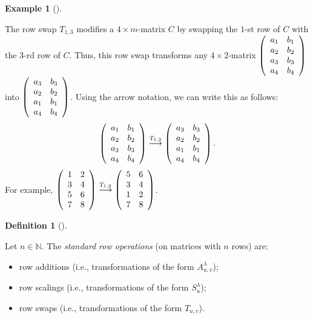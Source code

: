 \documentclass[numbers=enddot,12pt,final,onecolumn,notitlepage]{scrartcl}%
\theoremstyle{definition}
\newtheorem{defi}[theo]{Definition}
\newenvironment{definition}[1][]
{\begin{defi}[#1]\begin{leftbar}}
{\end{leftbar}\end{defi}}
\newtheorem{exam}[theo]{Example}
\newenvironment{example}[1][]
{\begin{exam}[#1]\begin{leftbar}}
{\end{leftbar}\end{exam}}
\begin{document}
\begin{example}
The row swap $T_{1,3}$ modifies a $4\times m$-matrix $C$ by swapping the
$1$-st row of $C$ with the $3$-rd row of $C$. Thus, this row swap transforms
any $4\times2$-matrix $\left(
\begin{array}
[c]{cc}%
a_{1} & b_{1}\\
a_{2} & b_{2}\\
a_{3} & b_{3}\\
a_{4} & b_{4}%
\end{array}
\right)  $ into $\left(
\begin{array}
[c]{cc}%
a_{3} & b_{3}\\
a_{2} & b_{2}\\
a_{1} & b_{1}\\
a_{4} & b_{4}%
\end{array}
\right)  $. Using the arrow notation, we can write this as follows:%
\[
\left(
\begin{array}
[c]{cc}%
a_{1} & b_{1}\\
a_{2} & b_{2}\\
a_{3} & b_{3}\\
a_{4} & b_{4}%
\end{array}
\right)  \overset{T_{1,3}}{\longrightarrow}\left(
\begin{array}
[c]{cc}%
a_{3} & b_{3}\\
a_{2} & b_{2}\\
a_{1} & b_{1}\\
a_{4} & b_{4}%
\end{array}
\right)  .
\]
For example, $\left(
\begin{array}
[c]{cc}%
1 & 2\\
3 & 4\\
5 & 6\\
7 & 8
\end{array}
\right)  \overset{T_{1,3}}{\longrightarrow}\left(
\begin{array}
[c]{cc}%
5 & 6\\
3 & 4\\
1 & 2\\
7 & 8
\end{array}
\right)  $.
\end{example}

\begin{definition}
Let $n\in\mathbb{N}$. The \textit{standard row operations} (on matrices with
$n$ rows) are:

\begin{itemize}
\item row additions (i.e., transformations of the form $A_{u,v}^{\lambda}$);

\item row scalings (i.e., transformations of the form $S_{u}^{\lambda}$);

\item row swaps (i.e., transformations of the form $T_{u,v}$).
\end{itemize}
\end{definition}
\end{document}
